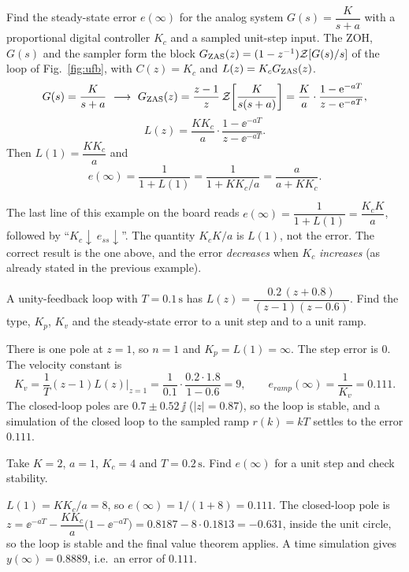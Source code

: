 \begin{example}\label{ex:ess-first}
Find the steady-state error $e(\infty)$ for the analog system $G(s)=\dfrac{K}{s+a}$ with a proportional
digital controller $K_c$ and a sampled unit-step input. The ZOH, $G(s)$ and the sampler form the block
$G_{\mathrm{ZAS}}(z)=(1-z^{-1})\mathcal{Z}\!\left[G(s)/s\right]$ of the loop of Fig.~\ref{fig:ufb}, with $C(z)=K_c$ and
$L(z)=K_cG_{\mathrm{ZAS}}(z)$.
\[
  G(s)=\frac{K}{s+a}\ \longrightarrow\ \GZAS(z)=\frac{z-1}{z}\,\ZT{\frac{K}{s(s+a)}}
  =\frac Ka\cdot\frac{1-\ee^{-aT}}{z-\ee^{-aT}},
\]
\[
  L(z)=\frac{K K_c}{a}\cdot\frac{1-\ee^{-aT}}{z-\ee^{-aT}}.
\]
Then $L(1)=\dfrac{K K_c}{a}$ and
\[
  e(\infty)=\frac{1}{1+L(1)}=\frac{1}{1+K K_c/a}=\frac{a}{a+K K_c}.
\]
\end{example}

\begin{boardnote}
The last line of this example on the board reads $e(\infty)=\dfrac{1}{1+L(1)}=\dfrac{K_cK}{a}$, followed by
``$K_c\downarrow\ e_{ss}\downarrow$''. The quantity $K_cK/a$ is $L(1)$, not the error. The correct result is the
one above, and the error \emph{decreases} when $K_c$ \emph{increases} (as already stated in the previous
example).
\end{boardnote}

\begin{problem}
A unity-feedback loop with $T=0.1\,\mathrm{s}$ has $L(z)=\dfrac{0.2\,(z+0.8)}{(z-1)(z-0.6)}$. Find the type,
$K_p$, $K_v$ and the steady-state error to a unit step and to a unit ramp.
\end{problem}
\begin{solution}
There is one pole at $z=1$, so $n=1$ and $K_p=L(1)=\infty$. The step error is $0$. The velocity constant is
\[
  K_v=\frac1T(z-1)L(z)\Big|_{z=1}=\frac{1}{0.1}\cdot\frac{0.2\cdot1.8}{1-0.6}=9,\qquad e_{ramp}(\infty)=\frac{1}{K_v}=0.111.
\]
The closed-loop poles are $0.7\pm0.52\,\jj$ ($|z|=0.87$), so the loop is stable, and a simulation of the
closed loop to the sampled ramp $r(k)=kT$ settles to the error $0.111$.
\end{solution}

\begin{problem}
Take $K=2$, $a=1$, $K_c=4$ and $T=0.2\,\mathrm{s}$. Find $e(\infty)$ for a unit step and check stability.
\end{problem}
\begin{solution}
$L(1)=KK_c/a=8$, so $e(\infty)=1/(1+8)=0.111$. The closed-loop pole is
$z=\ee^{-aT}-\dfrac{KK_c}{a}\bigl(1-\ee^{-aT}\bigr)=0.8187-8\cdot0.1813=-0.631$, inside the unit circle,
so the loop is stable and the final value theorem applies. A time simulation gives $y(\infty)=0.8889$, i.e.\ an
error of $0.111$.
\end{solution}

